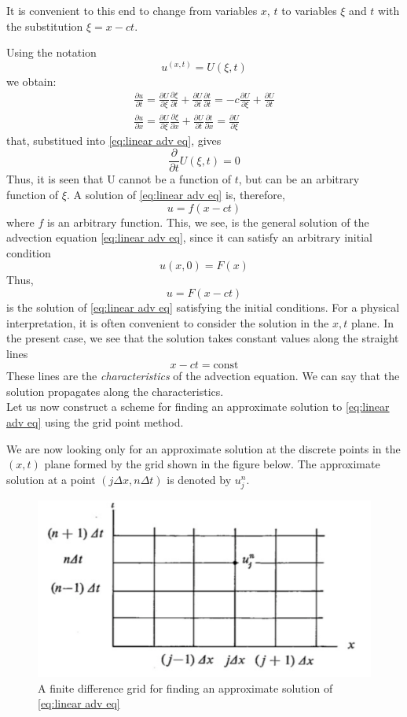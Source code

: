It is convenient to this end to change from variables $x$, $t$ to variables $\xi$ and $t$ with the substitution $\xi=x-ct$.

Using the notation
$$u^{(x,t)}=U(\xi,t)$$
we obtain:
\begin{align}
    \frac{\partial u}{\partial t}=\frac{\partial U}{\partial\xi}\frac{\partial\xi}{\partial t}+\frac{\partial U}{\partial t}\frac{\partial t}{\partial t}=-c\frac{\partial U}{\partial\xi}+\frac{\partial U}{\partial t}\\
    \frac{\partial u}{\partial x}=\frac{\partial U}{\partial\xi}\frac{\partial\xi}{\partial x}+\frac{\partial U}{\partial t}\frac{\partial t}{\partial x}=\frac{\partial U}{\partial\xi}
\end{align}
that, substitued into \ref{eq:linear adv eq}, gives
$$\frac{\partial}{\partial t}U(\xi, t)=0$$
Thus, it is seen that U cannot be a function of $t$, but can be an arbitrary function of $\xi$. A solution of \ref{eq:linear adv eq} is, therefore,
\begin{equation}\label{eq:sol of linear adv eq}
    u=f(x-ct)
\end{equation}
where $f$ is an arbitrary function. This, we see, is the general solution of the advection equation \ref{eq:linear adv eq}, since it can satisfy an arbitrary initial condition 
\begin{equation}
    u(x,0)=F(x)
\end{equation}
Thus, 
\begin{equation}
    u=F(x-ct)
\end{equation}
is the solution of \ref{eq:linear adv eq} satisfying the initial conditions. 
For a physical interpretation, it is often convenient to consider the solution in the $x, t$ plane. In the present case, we see that the solution takes constant values along the straight lines
$$x-ct= \text{const}$$
These lines are the \textit{characteristics} of the advection equa­tion. We can say that the solution propagates along the characteristics.\\





Let us now construct a scheme for finding an approxi­mate solution to \ref{eq:linear adv eq} using the grid point method.

We are now looking only for an approximate solution at the discrete points in the $(x,t)$ plane formed by the grid shown in the figure below. The approximate solution at a point $(j\Delta x,n\Delta t)$ is denoted by $u^n_j$.
\begin{figure}[htpb]
    \centering
    \includegraphics[width=0.35\linewidth]{uploads/Screenshot 2024-12-07 163047.png}
    \caption{A finite difference grid for finding an approximate solution of \ref{eq:linear adv eq}}
    \label{fig:grid sol lin adv eq}
\end{figure}

